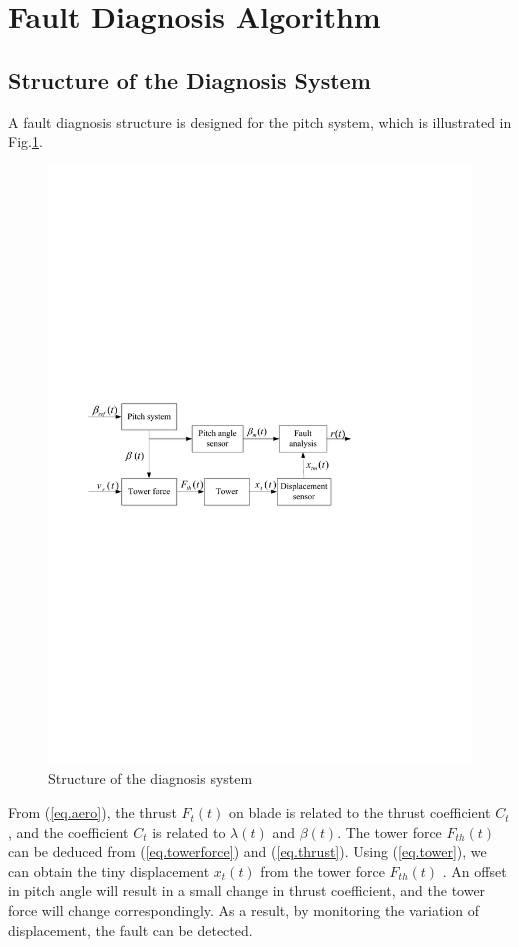 \documentclass{article}
\begin{document}
\section{Fault Diagnosis Algorithm }
\subsection{Structure of the Diagnosis System}

A fault diagnosis structure is designed for the pitch system,
which is illustrated in Fig.\ref{fig:faultstructure}.

\begin{figure}[!htb]
  \centering
  \includegraphics[width=0.8\hsize]{Visio-faultstructure.pdf}
  \caption{Structure of the diagnosis system}
  \label{fig:faultstructure}
\end{figure}

From (\ref{eq.aero}), the thrust $F_t(t)$ on
blade   is related to the thrust coefficient $C_t$ , and the coefficient $C_t$
is related to  $\lambda(t)$ and $\beta(t)$. The tower force $F_{th}(t)$
can be deduced from (\ref{eq.towerforce}) and (\ref{eq.thrust}).
Using (\ref{eq.tower}), we can obtain the tiny displacement $x_t(t)$
 from the tower force $F_{th}(t)$ . An offset in pitch angle will result
 in a small change in thrust coefficient, and the tower force will change
 correspondingly.
As a result, by monitoring the variation of displacement, the fault can be detected.
\end{document}
